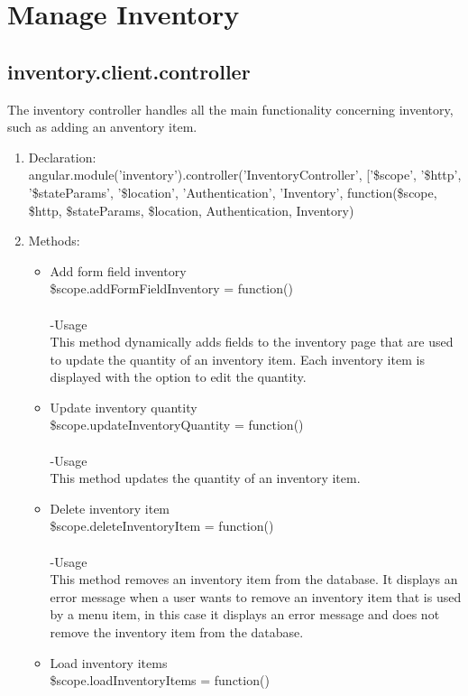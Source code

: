 \documentclass[a4paper,12pt]{article}
\begin{document}
\section{Manage Inventory}
\subsection{inventory.client.controller}
 The inventory controller handles all the main functionality concerning inventory, such as adding an anventory item.
\begin{enumerate}
\item Declaration:\\angular.module('inventory').controller('InventoryController', ['\$scope', '\$http', '\$stateParams', '\$location', 'Authentication', 'Inventory',
	function(\$scope, \$http, \$stateParams, \$location, Authentication, Inventory)
\item Methods:
	\begin{itemize}
	\item Add form field inventory\\
  \$scope.addFormFieldInventory = function()\\ \\
  -Usage\\ 
  This method dynamically adds fields to the inventory page that are used to update the quantity of an inventory item. Each inventory item is displayed with the option to edit the quantity.
\item  Update inventory quantity\\
 \$scope.updateInventoryQuantity = function()\\ \\
 -Usage\\
 This method updates the quantity of an inventory item.
 \item Delete inventory item\\
  \$scope.deleteInventoryItem = function()\\ \\
  -Usage\\ 
  This method removes an inventory item from the database. It displays an error message when a user wants to remove an inventory item that is used by a menu item, in this case it displays an error message and does not remove the inventory item from the database.
  \item Load inventory items\\
   \$scope.loadInventoryItems = function()\\ \\

\end{itemize}
\end{enumerate}
\end{document}
